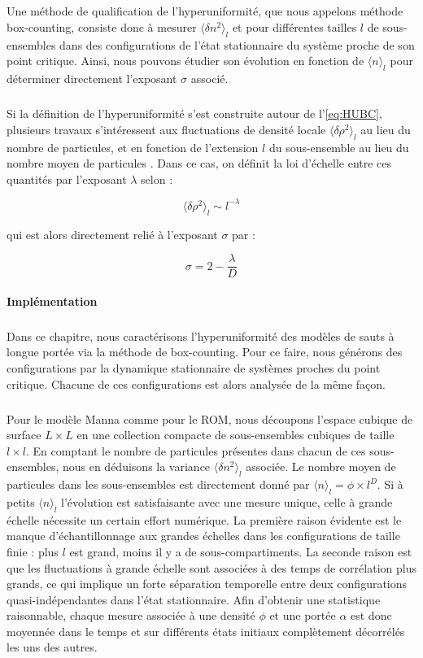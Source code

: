 \subparagraph{}Une méthode de qualification de l'hyperuniformité, que nous appelons méthode box-counting, consiste donc à mesurer $\langle \delta n^2\rangle_l$ et pour différentes tailles $l$ de sous-ensembles dans des configurations de l'état stationnaire du système proche de son point critique. Ainsi, nous pouvons étudier son évolution en fonction de $\langle n \rangle_l$ pour déterminer directement l'exposant $\sigma$ associé.

\subparagraph{}Si la définition de l'hyperuniformité s'est construite autour de l'\autoref{eq:HUBC}, plusieurs travaux s'intéressent aux fluctuations de densité locale $\langle \delta \rho^2\rangle_l$ au lieu du nombre de particules, et en fonction de l'extension $l$ du sous-ensemble au lieu du nombre moyen de particules \cite{hexner_hyperuniformity_2015, bub_lee_hyperuniformity_2019}. Dans ce cas, on définit la loi d'échelle entre ces quantités par l'exposant $\lambda$ selon :

\begin{equation}
	\langle \delta \rho^2\rangle_l \sim l^{-\lambda}
\end{equation}

\noindent qui est alors directement relié à l'exposant $\sigma$ par :

\begin{equation}
	\sigma = 2 - \frac{\lambda}{D}
\end{equation}

\paragraph{Implémentation}

\subparagraph{}Dans ce chapitre, nous caractérisons l'hyperuniformité des modèles de sauts à longue portée via la méthode de box-counting. Pour ce faire, nous générons des configurations par la dynamique stationnaire de systèmes proches du point critique. Chacune de ces configurations est alors analysée de la même façon.

\subparagraph{}Pour le modèle Manna comme pour le ROM, nous découpons l'espace cubique de surface $L\times L$ en une collection compacte de sous-ensembles cubiques de taille $l\times l$. En comptant le nombre de particules présentes dans chacun de ces sous-ensembles, nous en déduisons la variance $\langle \delta n^2\rangle_l$ associée. Le nombre moyen de particules dans les sous-ensembles est directement donné par  $\langle n \rangle_l= \phi \times l^D$. Si à petits $\langle n \rangle_l$ l'évolution est satisfaisante avec une mesure unique, celle à grande échelle nécessite un certain effort numérique. La première raison évidente est le manque d'échantillonnage aux grandes échelles dans les configurations de taille finie : plus $l$ est grand, moins il y a de sous-compartiments. La seconde raison est que les fluctuations à grande échelle sont associées à des temps de corrélation plus grands, ce qui implique un forte séparation temporelle entre deux configurations quasi-indépendantes dans l'état stationnaire. Afin d'obtenir une statistique raisonnable, chaque mesure associée à une densité $\phi$ et une portée $\alpha$ est donc moyennée dans le temps et sur différents états initiaux complètement décorrélés les uns des autres.

